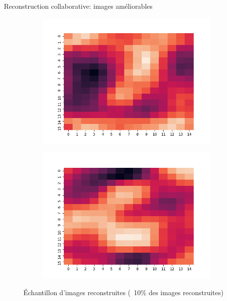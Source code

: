 \documentclass[hyperref={pdfpagelabels=false}]{beamer}
\begin{document}
\begin{frame}{Reconstruction collaborative: images améliorables}
\begin{figure}[h]
\begin{subfigure}[c]{0.18\textwidth}
                \includegraphics[scale=.12]{88}
            \end{subfigure}
            \begin{subfigure}[c]{0.18\textwidth}
                \includegraphics[scale=.12]{99}
            \end{subfigure}
            \caption{Échantillon d'images reconstruites (~10\% des images 
            reconstruites)}
        \end{figure}
    \end{frame}
\end{document}
